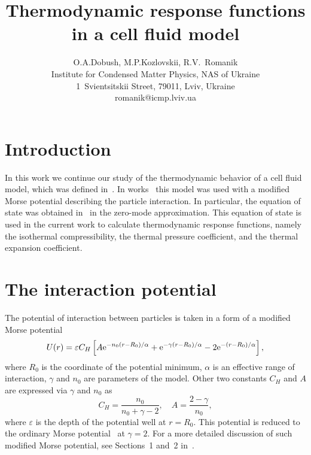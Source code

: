 \documentclass[12pt]{article}
\title{Thermodynamic response functions in a cell fluid model}
\author{O.A.Dobush, M.P.Kozlovskii, R.V.~Romanik
	\\ \small Institute for Condensed Matter Physics, NAS of Ukraine 
	\\ \small 1~Svientsitskii Street, 79011, Lviv, Ukraine 
	\\ \small romanik@icmp.lviv.ua}
\begin{document}
	
	\maketitle
	
	
	\section{Introduction}
	
	In this work we continue our study of the thermodynamic behavior of a cell fluid model, which was defined in~\cite{KozitskyKozlovskiiDobush2018book,KozitskyKozlovskiiDobush2020}. In works~\cite{KozlovskiiDobush2020,PylyukDobush2020,PylyukEtAlJML2023,PylyukKozlovskiiDobushUJP2023b} this model was used with a modified Morse potential describing the particle interaction. In particular, the equation of state was obtained in~\cite{KozlovskiiDobush2020} in the zero-mode approximation. This equation of state is used in the current work to calculate thermodynamic response functions, namely the isothermal compressibility, the thermal pressure coefficient, and the thermal expansion coefficient.
	
	\section{The interaction potential}
	The potential of interaction between particles is taken in a form of a modified Morse potential
	\begin{equation}
		\label{def:mod_morse}
		U(r) = \varepsilon C_{H} \left[A {\rm e}^{-n_0(r-R_0)/\alpha} + {\rm e}^{-\gamma(r - R_0)/\alpha} -2{\rm e}^{-(r-R_0)/\alpha}\right],
	\end{equation}
	where $R_0$ is the coordinate of the potential minimum, $\alpha$ is an effective range of interaction, $\gamma$ and $n_0$ are parameters of the model. Other two constants $C_{H}$ and $A$ are expressed via $\gamma$ and $n_0$ as
	\begin{equation}
		C_{H} = \frac{n_0}{n_0 + \gamma - 2}, \quad A = \frac{2 - \gamma}{n_0},
	\end{equation}
	where $\varepsilon$ is the depth of the potential well at $r=R_0$. This potential is reduced to the ordinary Morse potential~\cite{Morse1929} at $\gamma=2$. For a more detailed discussion of such modified Morse potential, see Sections~1 and~2 in~\cite{KozlovskiiDobush2020}.
	
\end{document}
